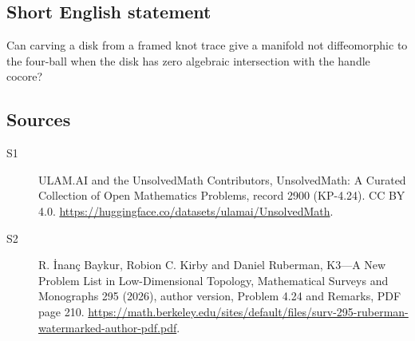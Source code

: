 \documentclass[11pt]{article}
\begin{document}
\subsection{Short English statement}
Can carving a disk from a framed knot trace give a manifold not diffeomorphic to the four-ball when the disk has zero algebraic intersection with the handle cocore?
\subsection{Sources}
\begin{description}
\item[\hypertarget{source:2900:1}{S1}] ULAM.AI and the UnsolvedMath Contributors, UnsolvedMath: A Curated Collection of Open Mathematics Problems, record 2900 (KP-4.24). CC BY 4.0. \url{https://huggingface.co/datasets/ulamai/UnsolvedMath}.
\item[\hypertarget{source:2900:2}{S2}] R. İnanç Baykur, Robion C. Kirby and Daniel Ruberman, K3—A New Problem List in Low-Dimensional Topology, Mathematical Surveys and Monographs 295 (2026), author version, Problem 4.24 and Remarks, PDF page 210. \url{https://math.berkeley.edu/sites/default/files/surv-295-ruberman-watermarked-author-pdf.pdf}.
\end{description}
\label{end:2900}
\end{document}
